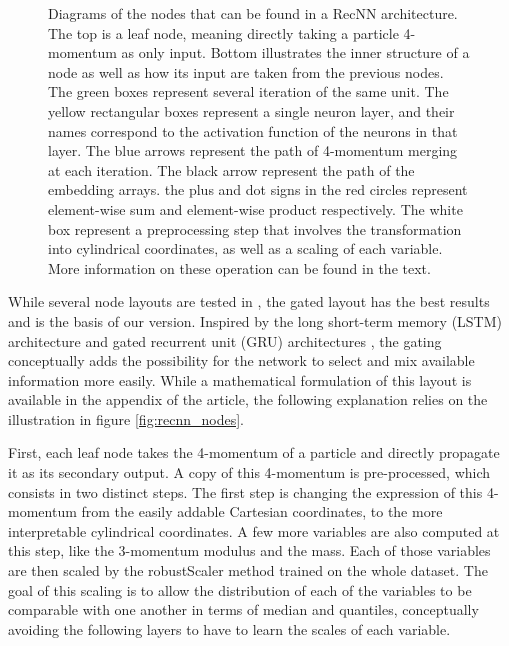 \begin{figure}
\begin{center}
    \caption{Diagrams of the nodes that can be found in a RecNN architecture. The top is a leaf node, meaning directly taking a particle 4-momentum as only input. Bottom illustrates the inner structure of a node as well as how its input are taken from the previous nodes. The green boxes represent several iteration of the same unit. The yellow rectangular boxes represent a single neuron layer, and their names correspond to the activation function of the neurons in that layer. The blue arrows represent the path of 4-momentum merging at each iteration. The black arrow represent the path of the embedding arrays. the plus and dot signs in the red circles represent element-wise sum and element-wise product respectively. The white box represent a preprocessing step that involves the transformation into cylindrical coordinates, as well as a scaling of each variable. More information on these operation can be found in the text.}
    \label{fig:recnn}
    \end{center}
\end{figure}

While several node layouts are tested in \cite{Louppe:2017ipp}, the gated layout has the best results and is the basis of our version. Inspired by the long short-term memory (LSTM) architecture \cite{lstm} and gated recurrent unit (GRU) architectures \cite{GRU}, the gating conceptually adds the possibility for the network to select and mix available information more easily. While a mathematical formulation of this layout is available in the appendix of the article, the following explanation relies on the illustration in figure \ref{fig:recnn_nodes}. 

First, each leaf node takes the 4-momentum of a particle and directly propagate it as its secondary output. A copy of this 4-momentum is pre-processed, which consists in two distinct steps. The first step is changing the expression of this 4-momentum from the easily addable Cartesian coordinates, to the more interpretable cylindrical coordinates. A few more variables are also computed at this step, like the 3-momentum modulus and the mass. Each of those variables are then scaled by the robustScaler method \cite{robustscale} trained on the whole dataset. The goal of this scaling is to allow the distribution of each of the variables to be comparable with one another in terms of median and quantiles, conceptually avoiding the following layers to have to learn the scales of each variable. 

